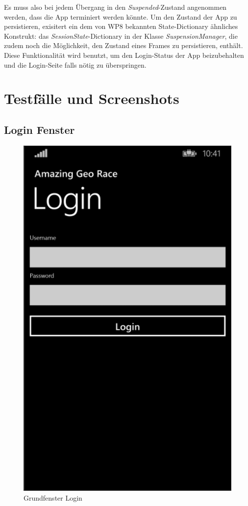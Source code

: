 \documentclass[a4paper,ngerman]{scrartcl}
\begin{document}
Es muss also bei jedem Übergang in den \textit{Suspended}-Zustand angenommen werden, dass die App terminiert werden könnte. Um den Zustand der App zu persistieren, exisitert ein dem von WP8 bekannten State-Dictionary ähnliches Konstrukt: das \textit{SessionState}-Dictionary in der Klasse \textit{SuspensionManager}, die zudem noch die Möglichkeit, den Zustand eines Frames zu persistieren, enthält. Diese Funktionalität wird benutzt, um den Login-Status der App beizubehalten und die Login-Seite falls nötig zu überspringen.


\newpage
\section{Testfälle und Screenshots}

\subsection{Login Fenster}

\begin{figure}[h]
\centering
\includegraphics[width=.95\textwidth]{images/loginPage}
\caption{Grundfenster Login}
\end{figure}
\end{document}
